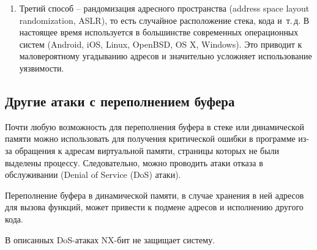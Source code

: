 \begin{enumerate}
    \item Третий способ -- рандомизация адресного пространства (address space layout randomization, ASLR), то есть случайное расположение стека, кода и~т.\,д. В настоящее время используется в большинстве современных операционных систем (Android, iOS, Linux, OpenBSD, OS X, Windows). Это приводит к маловероятному угадыванию адресов и значительно усложняет использование уязвимости.
\end{enumerate}


\subsection{Другие атаки с переполнением буфера}

Почти любую возможность для переполнения буфера в стеке или динамической памяти можно использовать для получения критической ошибки в программе из-за обращения к адресам виртуальной памяти, страницы которых не были выделены процессу. Следовательно, можно проводить атаки отказа в обслуживании (Denial of Service (DoS) атаки).

Переполнение буфера в динамической памяти, в случае хранения в ней адресов для вызова функций, может привести к подмене адресов и исполнению другого кода.

В описанных DoS-атаках NX-бит не защищает систему.
